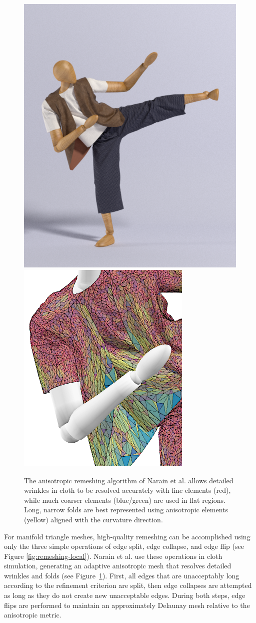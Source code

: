 \begin{figure}[t]
  \centering
  \includegraphics[width=0.35\linewidth]{images/starAdaptivity-cgf2016/cloth-render.png}
  \includegraphics[width=0.35\linewidth]{images/starAdaptivity-cgf2016/cloth-wire-zoom.png}
  \caption[STAR adaptivity: Anisotropic remeshing of triangular meshes]{The anisotropic remeshing algorithm of Narain et al. \cite{Narain2012} allows detailed wrinkles in cloth to be resolved accurately with fine elements (red), while much coarser elements (blue/green) are used in flat regions. Long, narrow folds are best represented using anisotropic elements (yellow) aligned with the curvature direction.}
  \label{fig:Narain2012}
\end{figure}

For manifold triangle meshes, high-quality remeshing can be accomplished using only the three simple operations of edge split, edge collapse, and edge flip (see Figure \ref{fig:remeshing-local}).
Narain et al. \cite{Narain2012} use these operations in cloth simulation, generating an adaptive anisotropic mesh that resolves detailed wrinkles and folds (see Figure~\ref{fig:Narain2012}).
First, all edges that are unacceptably long according to the refinement criterion are split, then edge collapses are attempted as long as they do not create new unacceptable edges.
During both steps, edge flips are performed to maintain an approximately Delaunay mesh relative to the anisotropic metric.

